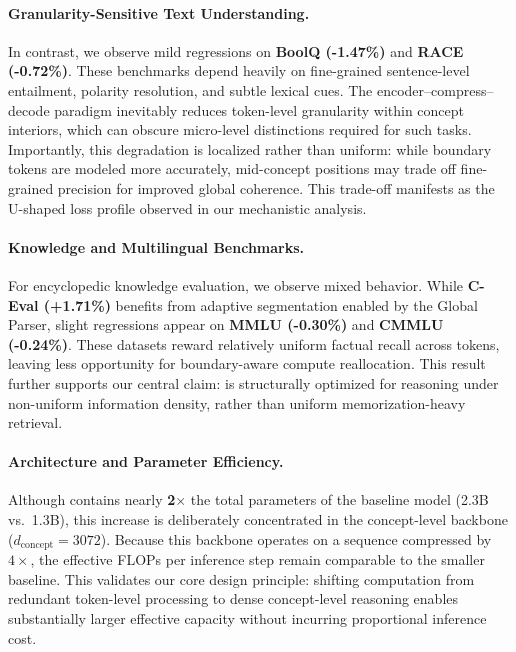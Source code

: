 \paragraph{Granularity-Sensitive Text Understanding.}
In contrast, we observe mild regressions on \textbf{BoolQ (-1.47\%)} and \textbf{RACE (-0.72\%)}.
These benchmarks depend heavily on fine-grained sentence-level entailment, polarity resolution, and subtle lexical cues.
The encoder--compress--decode paradigm inevitably reduces token-level granularity within concept interiors, which can obscure micro-level distinctions required for such tasks.
Importantly, this degradation is localized rather than uniform: while boundary tokens are modeled more accurately, mid-concept positions may trade off fine-grained precision for improved global coherence.
This trade-off manifests as the U-shaped loss profile observed in our mechanistic analysis.

\paragraph{Knowledge and Multilingual Benchmarks.}
For encyclopedic knowledge evaluation, we observe mixed behavior.
While \textbf{C-Eval (+1.71\%)} benefits from adaptive segmentation enabled by the Global Parser, slight regressions appear on \textbf{MMLU (-0.30\%)} and \textbf{CMMLU (-0.24\%)}.
These datasets reward relatively uniform factual recall across tokens, leaving less opportunity for boundary-aware compute reallocation.
This result further supports our central claim: \ModelName{} is structurally optimized for reasoning under non-uniform information density, rather than uniform memorization-heavy retrieval.

\paragraph{Architecture and Parameter Efficiency.}
Although \ModelName{} contains nearly \textbf{2$\times$} the total parameters of the baseline model (2.3B vs.\ 1.3B), this increase is deliberately concentrated in the concept-level backbone ($d_{\text{concept}}=3072$).
Because this backbone operates on a sequence compressed by $4\times$, the effective FLOPs per inference step remain comparable to the smaller baseline.
This validates our core design principle: shifting computation from redundant token-level processing to dense concept-level reasoning enables substantially larger effective capacity without incurring proportional inference cost.

